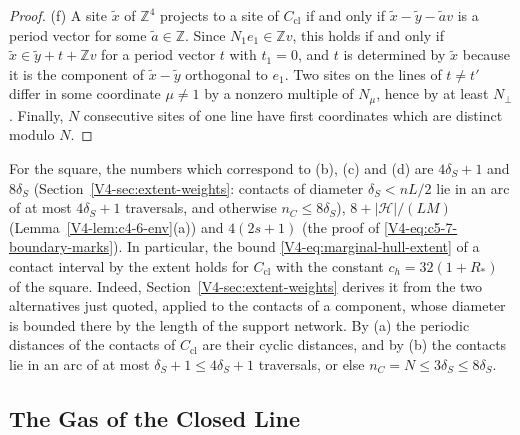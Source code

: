 \documentclass[11pt]{article}
\numberwithin{equation}{section}
\theoremstyle{remark}
\theoremstyle{plain}
\begin{document}
\begin{proof}
(f) A site $\tilde x$ of $\mathbb Z^4$ projects to a site of $C_{\mathrm{cl}}$ if and only if $\tilde x-\tilde y-\tilde av$ is a period vector for some $\tilde a\in\mathbb Z$. Since $N_1e_1\in\mathbb Zv$, this holds if and only if $\tilde x\in\tilde y+t+\mathbb Zv$ for a period vector $t$ with $t_1=0$, and $t$ is determined by $\tilde x$ because it is the component of $\tilde x-\tilde y$ orthogonal to $e_1$. Two sites on the lines of $t\neq t'$ differ in some coordinate $\mu\neq1$ by a nonzero multiple of $N_{\mu}$, hence by at least $N_{\perp}$. Finally, $N$ consecutive sites of one line have first coordinates which are distinct modulo $N$.
\end{proof}

For the square, the numbers which correspond to (b), (c) and (d) are $4\delta_S+1$ and $8\delta_S$ (Section~\ref{V4-sec:extent-weights}: contacts of diameter $\delta_S< nL/2$ lie in an arc of at most $4\delta_S+1$ traversals, and otherwise $n_C\leqslant 8\delta_S$), $8+|\mathcal H|/(LM)$ (Lemma~\ref{V4-lem:c4-6-env}(a)) and $4(2s+1)$ (the proof of \eqref{V4-eq:c5-7-boundary-marks}). In particular, the bound \eqref{V4-eq:marginal-hull-extent} of a contact interval by the extent holds for $C_{\mathrm{cl}}$ with the constant $c_h=32(1+R_*)$ of the square. Indeed, Section~\ref{V4-sec:extent-weights} derives it from the two alternatives just quoted, applied to the contacts of a component, whose diameter is bounded there by the length of the support network. By (a) the periodic distances of the contacts of $C_{\mathrm{cl}}$ are their cyclic distances, and by (b) the contacts lie in an arc of at most $\delta_S+1\leqslant 4\delta_S+1$ traversals, or else $n_C= N\leqslant 3\delta_S\leqslant 8\delta_S$.

\subsection{The Gas of the Closed Line}\label{sec:closed-line-gas}
\end{document}
